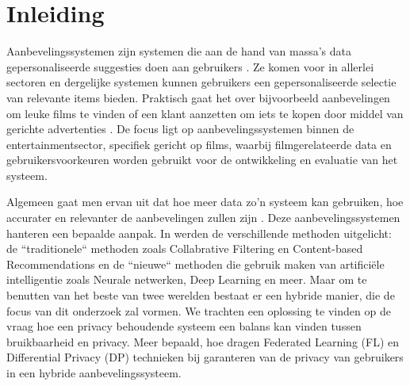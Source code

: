 


% 

\section{Inleiding}%
\label{sec:inleiding}

Aanbevelingssystemen zijn systemen die aan de hand van massa's data gepersonaliseerde suggesties doen aan gebruikers \autocite{Mazeh2020}. Ze komen voor in allerlei sectoren en dergelijke systemen kunnen gebruikers een gepersonaliseerde selectie van relevante items bieden. Praktisch gaat het over bijvoorbeeld aanbevelingen om leuke films te vinden of een klant aanzetten om iets te kopen door middel van gerichte advertenties \autocite{Patel2020}. De focus ligt op aanbevelingssystemen binnen de entertainmentsector, specifiek gericht op films, waarbij filmgerelateerde data en gebruikersvoorkeuren worden gebruikt voor de ontwikkeling en evaluatie van het systeem.

Algemeen gaat men ervan uit dat hoe meer data zo'n systeem kan gebruiken, hoe accurater en relevanter de aanbevelingen zullen zijn \autocite{Yang2020}. Deze aanbevelingssystemen hanteren een bepaalde aanpak. In \textcite{Amatriain2014} werden de verschillende methoden uitgelicht: de ``traditionele`` methoden zoals Collabrative Filtering en Content-based Recommendations en de ``nieuwe`` methoden die gebruik maken van artificiële intelligentie zoals Neurale netwerken, Deep Learning en meer. Maar om te benutten van het beste van twee werelden bestaat er een hybride manier, die de focus van dit onderzoek zal vormen. We trachten een oplossing te vinden op de vraag hoe een privacy behoudende systeem een balans kan vinden tussen bruikbaarheid en privacy. Meer bepaald, hoe dragen Federated Learning (FL) en Differential Privacy (DP) technieken bij garanteren van de privacy van gebruikers in een hybride aanbevelingssysteem.

